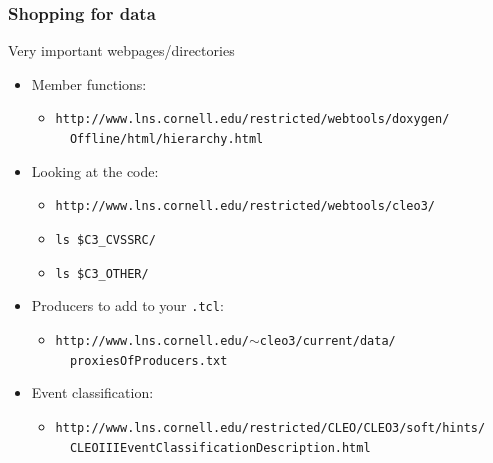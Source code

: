 \documentclass[12pt,compress]{beamer}
\begin{document}
\begin{frame}
\frametitle{Shopping for data}
Very important webpages/directories

\begin{itemize}\setlength{\itemsep}{-0.25 cm}
\item Member functions:

\begin{itemize}
\item {\tt \scriptsize http://www.lns.cornell.edu/restricted/webtools/doxygen/ \\
\mbox{ } \hfill Offline/html/hierarchy.html}
\end{itemize}

\item Looking at the code:

\begin{itemize}
\item {\tt \scriptsize http://www.lns.cornell.edu/restricted/webtools/cleo3/}
\item {\tt \scriptsize ls \$C3\_CVSSRC/}
\item {\tt \scriptsize ls \$C3\_OTHER/}
\end{itemize}

\vspace{0.25 cm}
\item Producers to add to your {\tt .tcl}:

\begin{itemize}
\item {\tt \scriptsize http://www.lns.cornell.edu/$\sim$cleo3/current/data/ \\
\mbox{ } \hfill proxiesOfProducers.txt}
\end{itemize}

\item Event classification:

\begin{itemize}
\item {\tt \scriptsize http://www.lns.cornell.edu/restricted/CLEO/CLEO3/soft/hints/ \\
\mbox{ } \hfill CLEOIIIEventClassificationDescription.html}
\end{itemize}

\end{itemize}
\label{numpages}
\end{frame}
\end{document}
